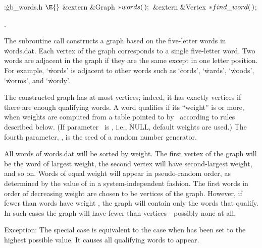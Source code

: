 \Y\B\4:\.{gb\_words.h }\X${}\E{}$\6
\&{extern} \&{Graph} ${}{*}\\{words}(\,);{}$\6
\&{extern} \&{Vertex} ${}{*}\\{find\_word}(\,){}$;\par
{}.\fi

The subroutine call 
constructs a graph based on the five-letter words in \.{words.dat}.
Each vertex of the graph corresponds to a single five-letter word. Two
words are adjacent in the graph if they are the same except in one
letter position. For example, `\.{words}' is adjacent to other words such as
`\.{cords}', `\.{wards}', `\.{woods}', `\.{worms}', and `\.{wordy}'.

The constructed graph has at most  vertices; indeed, it has exactly
 vertices if there are enough qualifying words. A word qualifies
if its ``weight'' is  or more, when weights are
computed from a table pointed to by~ according to rules
described below. (If parameter~
is \PB{$\NULL$}, i.e., \.{NULL}, default weights are used.) The fourth
parameter,
, is the seed of a random number generator.

All words of \.{words.dat} will be sorted by weight. The first vertex of
the graph will be the word of largest
weight, the second vertex will have second-largest weight, and so on.
Words of equal weight will appear in pseudo-random order, as determined
by the value of  in a system-independent fashion.
The first  words in order of decreasing weight are chosen to be
vertices of the graph. However, if fewer than  words have weight , the graph will contain only the words that qualify. In
such cases the graph will have fewer than  vertices---possibly none at
all.

Exception: The special case  is equivalent to the case when %
has been set to the highest possible value. It causes all qualifying
words to appear.

